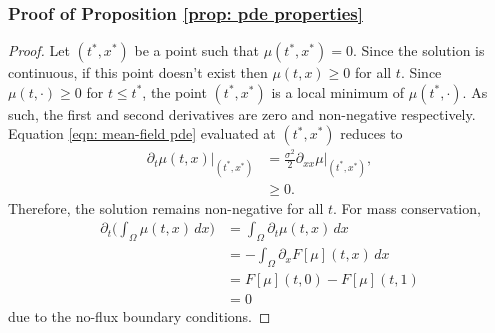 \documentclass[10pt]{article}
\begin{document}
\subsubsection*{Proof of Proposition \ref{prop: pde properties}}
\begin{proof}
    Let $(t^*,x^*)$ be a point such that $\mu(t^*,x^*) = 0$. Since the solution is continuous, if this point doesn't exist then $\mu(t,x) \geq 0$ for all $t$. Since $\mu(t,\cdot) \ge 0$ for $t \leq t^*$, the point $(t^*,x^*)$ is a local minimum of $\mu(t^*,\cdot)$. As such, the first and second derivatives are zero and non-negative respectively. 
    Equation \eqref{eqn: mean-field pde} evaluated at $(t^*,x^*)$ reduces to
    \begin{align*}
        \partial_t\mu(t,x)\bigg|_{(t^*,x^*)} &= \frac{\sigma^2}{2}\partial_{xx}\mu|_{(t^*,x^*)},\\
        &\geq 0.
    \end{align*}
Therefore, the solution remains non-negative for all $t$. For mass conservation, 
    \begin{align*}
        \partial_t \bigg( \int_\Omega \mu(t,x) \, dx \bigg) 
        &= \int_\Omega \partial_t \mu(t,x) \, dx \\
        &= -\int_\Omega \partial_xF[\mu](t,x) \, dx \\
        &= F[\mu](t,0) - F[\mu](t,1) \\
        &= 0 
    \end{align*}
    due to the no-flux boundary conditions. 
\end{proof}
\end{document}
